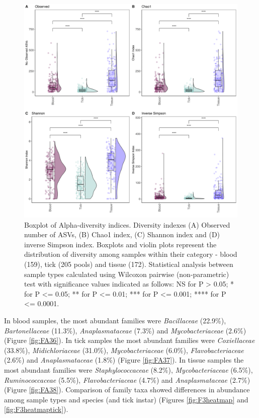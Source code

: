 \documentclass[a4paper, nobind]{templates/ociamthesis}
\begin{document}
\begin{figure}
\includegraphics[width=0.95\linewidth]{figures/ms-figs/Ch3-alphadiv} \caption[Alpha diversity of microbiome community for wildlife blood, tissue and ticks.]{Boxplot of Alpha-diversity indices. Diversity indexes (A) Observed number of ASVs, (B) Chao1 index, (C) Shannon index and (D) inverse Simpson index. Boxplots and violin plots represent the distribution of diversity among samples within their category - blood (159), tick (205 pools) and tissue (172). Statistical analysis between sample types calculated using Wilcoxon pairwise (non-parametric) test with significance values indicated as follows: NS for P > 0.05; * for P <= 0.05; ** for P <= 0.01; *** for P <= 0.001; **** for P <= 0.0001.}\label{fig:F3alpha}
\end{figure}

In blood samples, the most abundant families were \emph{Bacillaceae} (22.9\%), \emph{Bartonellaceae} (11.3\%), \emph{Anaplasmataceae} (7.3\%) and \emph{Mycobacteriaceae} (2.6\%) (Figure \ref{fig:FA36}).
In tick samples the most abundant families were \emph{Coxiellaceae} (33.8\%), \emph{Midichloriaceae} (31.0\%), \emph{Mycobacteriaceae} (6.0\%), \emph{Flavobacteriaceae} (2.6\%) and \emph{Anaplasmataceae} (1.8\%) (Figure \ref{fig:FA37}).
In tissue samples the most abundant families were \emph{Staphylococcaceae} (8.2\%), \emph{Mycobacteriaceae} (6.5\%), \emph{Ruminococcaceae} (5.5\%), \emph{Flavobacteriaceae} (4.7\%) and \emph{Anaplasmataceae} (2.7\%) (Figure \ref{fig:FA38}).
Comparison of family taxa showed differences in abundance among sample types and species (and tick instar) (Figures \ref{fig:F3heatmap} and \ref{fig:F3heatmaptick}).
\end{document}
